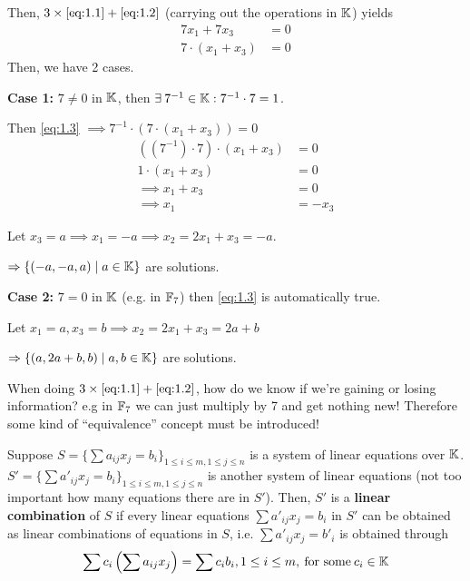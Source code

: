 \begin{explanation}
    Then, \(3 \times\eqref{eq:1.1} +\eqref{eq:1.2}\) (carrying out the operations in \(\mathbb{K}\)) yields
    \begin{equation} \label{eq:1.3}
        \begin{split}
            7x_1 + 7x_3 &= 0 \\
            7 \cdot (x_1 + x_3) &= 0
        \end{split}
    \end{equation}
    Then, we have 2 cases.

    \textbf{Case 1:} \(7 \neq 0\) in \(\mathbb{K}\), then \(\exists 7^{-1} \in \bbk: 7^{-1}\cdot 7 = 1\).

    Then \eqref{eq:1.3} \(\implies 7^{-1} \cdot (7 \cdot (x_1+x_3)) = 0\)
    \begin{align*}
        ((7^{-1})\cdot 7) \cdot (x_1 + x_3) & = 0    \\
        1 \cdot (x_1 + x_3)                 & = 0    \\
        \implies x_1 + x_3                  & = 0    \\
        \implies x_1                        & = -x_3
    \end{align*}

    Let \(x_3=a \implies x_1 = -a \implies x_2 = 2x_1 + x_3 = -a\).

    \(\Rightarrow \{(-a, -a, a) \mid a \in \mathbb{K}\}\) are solutions.

    \hfill

    \textbf{Case 2:} \(7 = 0 \) in \(\mathbb{K}\) (e.g. in \(\mathbb{F}_7\)) then \eqref{eq:1.3} is automatically true.

    Let \(x_1 = a, x_3 = b \implies x_2 = 2x_1 + x_3= 2a+b\)

    \(\Rightarrow \{(a, 2a+b, b) \mid a, b \in \mathbb{K}\}\) are solutions.
\end{explanation}

\begin{remark}
    When doing \(3 \times \eqref{eq:1.1} + \eqref{eq:1.2}\), how do we know if we're gaining or losing information? e.g in \(\mathbb{F}_7\) we can just multiply by 7 and get nothing new! Therefore some kind of ``equivalence'' concept must be introduced!
\end{remark}

\begin{definition} 
    Suppose \(S = \{\sum a_{ij}x_j = b_i\}_{1 \leq i \leq m, 1\leq j \leq n}\) is a system of linear equations over \(\mathbb{K}\). \(S' = \{\sum a'_{ij}x_j = b_i\}_{1 \leq i \leq m, 1\leq j \leq n}\) is another system of linear equations (not too important how many equations there are in \(S'\)). Then, \(S'\) is a \textbf{linear combination} of \(S\) if every linear equations \(\sum a'_{ij}x_j = b_i\) in \(S'\) can be obtained as linear combinations of equations in \(S\), i.e. \(\sum a'_{ij}x_j = b'_i\) is obtained through \[
        \sum c_i\left(\sum a_{ij}x_j\right) = \sum c_i b_i, 1 \leq i \leq m,\:\text{for some}\: c_i \in \mathbb{K}
    \]
\end{definition}


